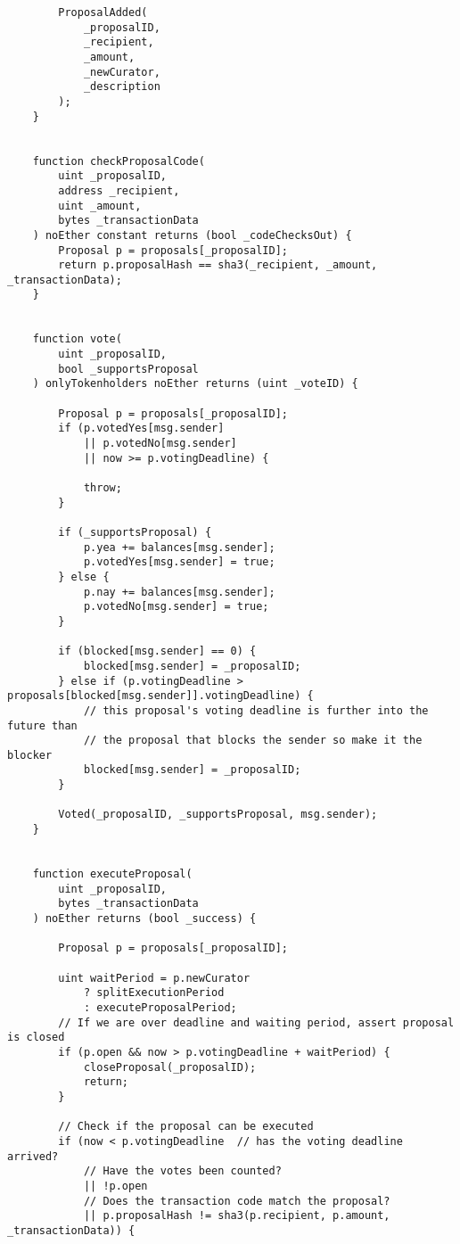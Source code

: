 \documentclass[9pt,oneside]{amsart}
\begin{document}
\begin{appendix}
\begin{verbatim}
        ProposalAdded(
            _proposalID,
            _recipient,
            _amount,
            _newCurator,
            _description
        );
    }


    function checkProposalCode(
        uint _proposalID,
        address _recipient,
        uint _amount,
        bytes _transactionData
    ) noEther constant returns (bool _codeChecksOut) {
        Proposal p = proposals[_proposalID];
        return p.proposalHash == sha3(_recipient, _amount, _transactionData);
    }


    function vote(
        uint _proposalID,
        bool _supportsProposal
    ) onlyTokenholders noEther returns (uint _voteID) {

        Proposal p = proposals[_proposalID];
        if (p.votedYes[msg.sender]
            || p.votedNo[msg.sender]
            || now >= p.votingDeadline) {

            throw;
        }

        if (_supportsProposal) {
            p.yea += balances[msg.sender];
            p.votedYes[msg.sender] = true;
        } else {
            p.nay += balances[msg.sender];
            p.votedNo[msg.sender] = true;
        }

        if (blocked[msg.sender] == 0) {
            blocked[msg.sender] = _proposalID;
        } else if (p.votingDeadline > proposals[blocked[msg.sender]].votingDeadline) {
            // this proposal's voting deadline is further into the future than
            // the proposal that blocks the sender so make it the blocker
            blocked[msg.sender] = _proposalID;
        }

        Voted(_proposalID, _supportsProposal, msg.sender);
    }


    function executeProposal(
        uint _proposalID,
        bytes _transactionData
    ) noEther returns (bool _success) {

        Proposal p = proposals[_proposalID];

        uint waitPeriod = p.newCurator
            ? splitExecutionPeriod
            : executeProposalPeriod;
        // If we are over deadline and waiting period, assert proposal is closed
        if (p.open && now > p.votingDeadline + waitPeriod) {
            closeProposal(_proposalID);
            return;
        }

        // Check if the proposal can be executed
        if (now < p.votingDeadline  // has the voting deadline arrived?
            // Have the votes been counted?
            || !p.open
            // Does the transaction code match the proposal?
            || p.proposalHash != sha3(p.recipient, p.amount, _transactionData)) {


\end{verbatim}
\end{appendix}
\end{document}
